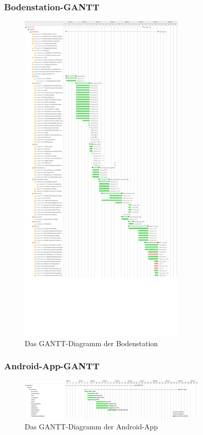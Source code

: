 \subsubsection {Bodenstation-GANTT}
\begin{figure}[H]
	\centering
	\includegraphics[width=0.7\textwidth]{8_Anhang/software-gantt.png}
	\caption{Das GANTT-Diagramm der Bodenstation}
	\label{gantt_software}
\end{figure}
\newpage
\subsubsection {Android-App-GANTT}
\begin{figure}[H]
	\centering
	\includegraphics[width=0.8\textwidth]{8_Anhang/android-app-gantt.png}
	\caption{Das GANTT-Diagramm der Android-App}
	\label{gantt_android}
\end{figure}

